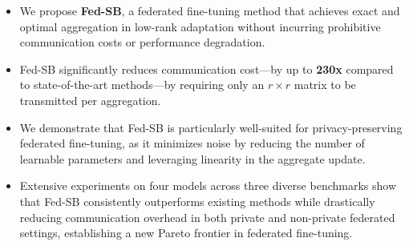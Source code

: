 \begin{itemize}
    \item We propose \textbf{Fed-SB}, a federated fine-tuning method that achieves exact and optimal aggregation in low-rank adaptation without incurring prohibitive communication costs or performance degradation.
    \item Fed-SB significantly reduces communication cost—by up to \textbf{230x} compared to state-of-the-art methods—by requiring only an \( r \times r \) matrix to be transmitted per aggregation.
    \item We demonstrate that Fed-SB is particularly well-suited for privacy-preserving federated fine-tuning, as it minimizes noise by reducing the number of learnable parameters and leveraging linearity in the aggregate update.
    \item Extensive experiments on four models across three diverse benchmarks show that Fed-SB consistently outperforms existing methods while drastically reducing communication overhead in both private and non-private federated settings, establishing a new Pareto frontier in federated fine-tuning.
\end{itemize}



